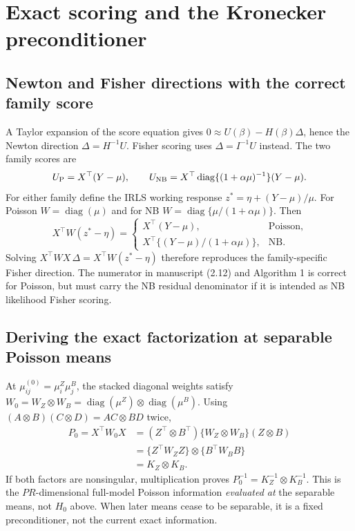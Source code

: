 \documentclass[11pt,a4paper]{article}
\newcommand{\diag}{\operatorname{diag}}
\numberwithin{equation}{section}
\begin{document}
\section{Exact scoring and the Kronecker preconditioner}
\label{lesion-preconditioner}

\subsection{Newton and Fisher directions with the correct family score}
A Taylor expansion of the score equation gives
$0\approx U(\beta)-H(\beta)\Delta$, hence the Newton direction
$\Delta=H^{-1}U$.
Fisher scoring uses $\Delta=I^{-1}U$ instead.
The two family scores are
\[
 U_{\rm P}=X^\top(Y-\mu),\qquad
 U_{\rm NB}=X^\top\diag\{(1+\alpha\mu)^{-1}\}(Y-\mu).
\]
For either family define the IRLS working response
$z^*=\eta+(Y-\mu)/\mu$.
For Poisson $W=\diag(\mu)$ and for NB
$W=\diag\{\mu/(1+\alpha\mu)\}$.
Then
\[
 X^\top W(z^*-\eta)
 =\begin{cases}
 X^\top(Y-\mu),&\text{Poisson},\\
 X^\top\{(Y-\mu)/(1+\alpha\mu)\},&\text{NB}.
 \end{cases}
\]
Solving $X^\top WX\,\Delta=X^\top W(z^*-\eta)$ therefore
reproduces the family-specific Fisher direction.
The numerator in manuscript (2.12) and Algorithm 1 is correct
for Poisson, but must carry the NB residual denominator if it
is intended as NB likelihood Fisher scoring.

\subsection{Deriving the exact factorization at separable Poisson means}
At $\mu_{ij}^{(0)}=\mu_i^Z\mu_j^B$, the stacked diagonal weights satisfy
$W_0=W_Z\otimes W_B=\diag(\mu^Z)\otimes\diag(\mu^B)$.
Using $(A\otimes B)(C\otimes D)=AC\otimes BD$ twice,
\begin{align}
 P_0=X^\top W_0X
 &=(Z^\top\otimes B^\top)
       \{W_Z\otimes W_B\}(Z\otimes B)\\
 &=\{Z^\top W_ZZ\}\otimes\{B^\top W_BB\}\\
 &=K_Z\otimes K_B.
 \label{lesion-kron}
\end{align}
If both factors are nonsingular, multiplication proves
$P_0^{-1}=K_Z^{-1}\otimes K_B^{-1}$.
This is the $PR$-dimensional full-model Poisson information
\emph{evaluated at} the separable means, not $H_0$ above.
When later means cease to be separable, it is a fixed preconditioner,
not the current exact information.
\end{document}
